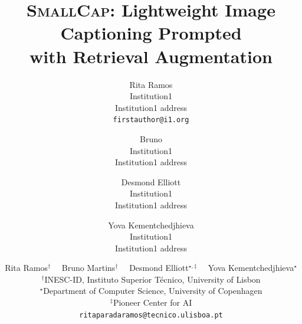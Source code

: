 \documentclass[10pt,twocolumn,letterpaper]{article}
\begin{document}
\title{\textsc{SmallCap}: Lightweight Image Captioning Prompted \\with Retrieval Augmentation
}



\author{Rita Ramos\\
Institution1\\
Institution1 address\\
{\tt\small firstauthor@i1.org}
\and
Bruno\\
Institution1\\
Institution1 address\\
\and
Desmond Elliott\\
Institution1\\
Institution1 address\\
\and
Yova Kementchedjhieva \\
Institution1\\
Institution1 address\\
}

\author{Rita Ramos$^{\dagger}$ \ \ Bruno Martins$^{\dagger}$ \ \ Desmond Elliott$^{\star,\ddagger}$ \ \ Yova Kementchedjhieva$^{\star}$ \\
        $^{\dagger}$INESC-ID, Instituto Superior Técnico, University of Lisbon \\ $^{\star}$Department of Computer Science, University of Copenhagen \\ $^{\ddagger}$Pioneer Center for AI \\
        \texttt{ritaparadaramos@tecnico.ulisboa.pt}}
\maketitle





%
%
\end{document}
